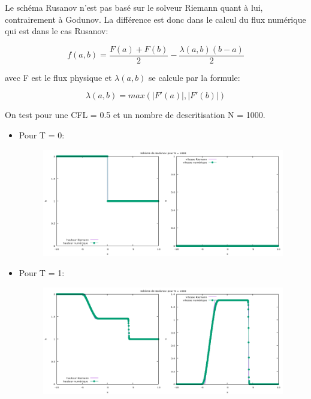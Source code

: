 Le sch\'ema Rusanov n'est pas bas\'e sur le solveur Riemann quant \`a lui, contrairement \`a Godunov. La diff\'erence est donc dans le calcul du flux num\'erique qui est dans le cas Rusanov:

$$f(a,b) = \frac{F(a) + F(b)}{2} - \frac{\lambda(a,b)(b-a)}{2}$$

avec F est le flux physique et $\lambda(a,b)$ se calcule par la formule:

$$\lambda(a,b) = max(|F'(a)|,|F'(b)|)$$

On test pour une CFL = 0.5 et un nombre de descritisation N = 1000.

\begin{itemize}

\item Pour T = 0:

\begin{figure}[h!]
	\centering \includegraphics[scale=0.5]{Images_Fichiers/tp2rusa000_0.png}
\end{figure}

\item Pour T = 1:

\begin{figure}[h!]
	\centering \includegraphics[scale=0.5]{Images_Fichiers/tp2rusa1000_1.png}
\end{figure}


\end{itemize}
